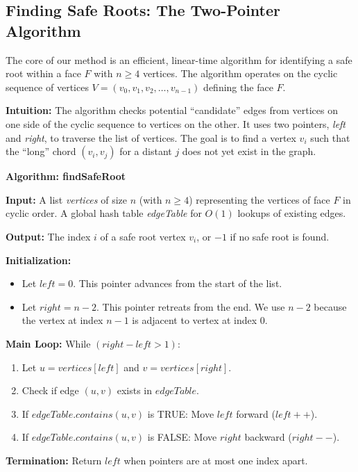 \documentclass[12pt,a4paper]{article}
\begin{document}
\subsection{Finding Safe Roots: The Two-Pointer Algorithm}

The core of our method is an efficient, linear-time algorithm for identifying a safe root within a face $F$ with $n \geq 4$ vertices. The algorithm operates on the cyclic sequence of vertices $V = (v_0, v_1, v_2, \ldots, v_{n-1})$ defining the face $F$.

\textbf{Intuition:} The algorithm checks potential ``candidate'' edges from vertices on one side of the cyclic sequence to vertices on the other. It uses two pointers, \textit{left} and \textit{right}, to traverse the list of vertices. The goal is to find a vertex $v_i$ such that the ``long'' chord $(v_i, v_j)$ for a distant $j$ does not yet exist in the graph.

\textbf{Algorithm: findSafeRoot}

\textbf{Input:} A list \textit{vertices} of size $n$ (with $n \geq 4$) representing the vertices of face $F$ in cyclic order. A global hash table \textit{edgeTable} for $O(1)$ lookups of existing edges.

\textbf{Output:} The index $i$ of a safe root vertex $v_i$, or $-1$ if no safe root is found.

\textbf{Initialization:}
\begin{itemize}
    \item Let $left = 0$. This pointer advances from the start of the list.
    \item Let $right = n - 2$. This pointer retreats from the end. We use $n-2$ because the vertex at index $n-1$ is adjacent to vertex at index $0$.
\end{itemize}

\textbf{Main Loop:}
While $(right - left > 1)$:
\begin{enumerate}
    \item Let $u = vertices[left]$ and $v = vertices[right]$.
    \item Check if edge $(u, v)$ exists in $edgeTable$.
    \item If $edgeTable.contains(u, v)$ is TRUE: Move $left$ forward ($left++$).
    \item If $edgeTable.contains(u, v)$ is FALSE: Move $right$ backward ($right--$).
\end{enumerate}

\textbf{Termination:} Return $left$ when pointers are at most one index apart.
\end{document}
